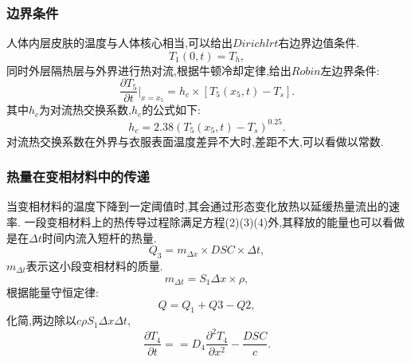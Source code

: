 \documentclass{whutmod}
\begin{document}
\subsubsection{边界条件}
人体内层皮肤的温度与人体核心相当,可以给出$Dirichlrt$右边界边值条件.
\begin{equation}
T_{1}(0,t)=T_{h},
\end{equation}
同时外层隔热层与外界进行热对流,根据牛顿冷却定律,给出$Robin$左边界条件:
\begin{equation}
\frac{\partial T_{5}}{\partial{t}}\big|_{x=x_{5}}=h_{c}\times[T_{5}(x_{5},t)-T_{s}].
\end{equation}
其中$h_{c}$为对流热交换系数,$h_{c}$的公式如下:
\begin{equation}
h_{c}=2.38(T_{5}(x_{5},t)-T_{s})^{0.25}.
\end{equation}
对流热交换系数在外界与衣服表面温度差异不大时,差距不大,可以看做以常数.

\subsubsection{热量在变相材料中的传递}
当变相材料的温度下降到一定阈值时,其会通过形态变化放热以延缓热量流出的速率.
一段变相材料上的热传导过程除满足方程(2)(3)(4)外,其释放的能量也可以看做是在$\Delta t$时间内流入短杆的热量.
\begin{equation}
Q_{3}= m_{\Delta x}\times DSC \times \Delta t,
\end{equation}
$m_{\Delta t}$表示这小段变相材料的质量.
\begin{equation}
m_{\Delta t}=S_{1}\Delta x\times \rho,
\end{equation}
根据能量守恒定律:
\begin{equation}
Q=Q_{1}+Q{3}-Q{2},
\end{equation}
化简,两边除以$c\rho S_{1}\Delta x\Delta t$,
\begin{equation}
\frac{\partial T_{4}}{\partial t}==D_{4}\frac{\partial^{2}T_{4}}{\partial x^{2}}-\frac{DSC}{c}.
\end{equation}
\end{document}
